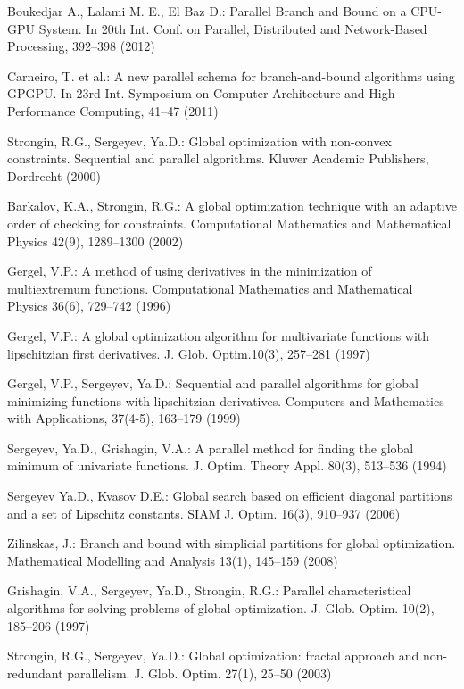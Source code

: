 \documentclass[smallcondensed]{svjour3}     %
\begin{document}
\begin{thebibliography}{}
Boukedjar A., Lalami M. E., El Baz D.: Parallel Branch and Bound on a CPU-GPU System. In 20th Int. Conf. on Parallel,  Distributed and Network-Based Processing, 392--398 (2012)

Carneiro, T. et al.: A new parallel schema for branch-and-bound algorithms using GPGPU. In 23rd Int. Symposium on Computer Architecture and High Performance Computing, 41--47 (2011)

Strongin, R.G., Sergeyev, Ya.D.: Global optimization with non-convex constraints. Sequential and parallel algorithms. Kluwer Academic Publishers, Dordrecht (2000)

Barkalov, K.A., Strongin, R.G.: A global optimization technique with an adaptive order of checking for constraints. Computational Mathematics and Mathematical Physics 42(9), 1289--1300 (2002)

Gergel, V.P.: A method of using derivatives in the minimization of multiextremum functions. Computational Mathematics and Mathematical Physics 36(6), 729--742 (1996)

Gergel, V.P.: A global optimization algorithm for multivariate functions with lipschitzian first derivatives. J. Glob. Optim.10(3), 257--281 (1997)

Gergel, V.P., Sergeyev, Ya.D.: Sequential and parallel algorithms for global minimizing functions with lipschitzian derivatives. Computers and Mathematics with Applications, 37(4-5), 163--179 (1999)

Sergeyev, Ya.D., Grishagin, V.A.: A parallel method for finding the global minimum of univariate functions. J. Optim. Theory Appl. 80(3), 513--536 (1994)

Sergeyev Ya.D., Kvasov D.E.: Global search based on efficient diagonal partitions and a set of Lipschitz constants. SIAM J. Optim. 16(3), 910--937 (2006)

Zilinskas, J.: Branch and bound with simplicial partitions for global optimization. Mathematical Modelling and Analysis 13(1), 145--159 (2008)

Grishagin, V.A., Sergeyev, Ya.D., Strongin, R.G.: Parallel characteristical algorithms for solving problems of global optimization. J. Glob. Optim. 10(2), 185--206 (1997)

Strongin, R.G., Sergeyev, Ya.D.: Global optimization: fractal approach and non-redundant parallelism. J. Glob. Optim. 27(1), 25--50 (2003)


\end{thebibliography}
\end{document}
